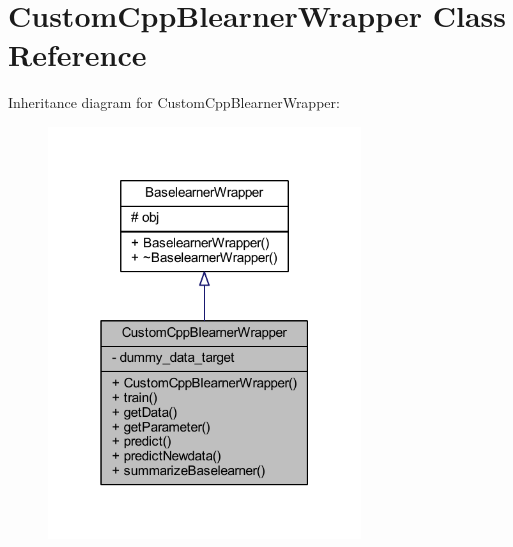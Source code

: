 \hypertarget{class_custom_cpp_blearner_wrapper}{}\section{Custom\+Cpp\+Blearner\+Wrapper Class Reference}
\label{class_custom_cpp_blearner_wrapper}


Inheritance diagram for Custom\+Cpp\+Blearner\+Wrapper\+:\nopagebreak
\begin{figure}[H]
\begin{center}
\leavevmode
\includegraphics[width=235pt]{class_custom_cpp_blearner_wrapper__inherit__graph}
\end{center}
\end{figure}


